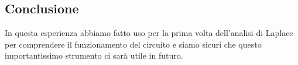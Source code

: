 \subsection{Conclusione}

In questa esperienza abbiamo fatto uso per la prima volta dell'analisi di Laplace
per comprendere il funzionamento del circuito e siamo sicuri che questo importantissimo strumento
ci sarà utile in futuro.
